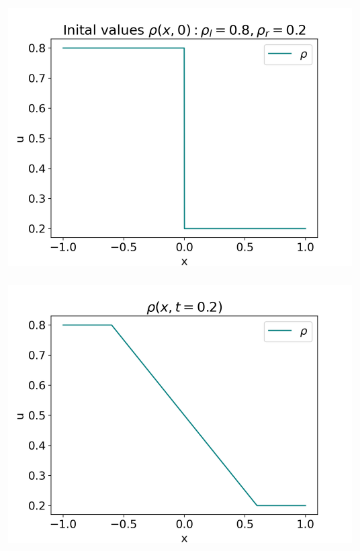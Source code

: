 \documentclass[10pt]{article}
\numberwithin{equation}{section}
\begin{document}
\begin{figure}
     \centering
     \begin{subfigure}[b]{0.3\textwidth}
         \centering
         \includegraphics[width=\textwidth]{Figures/Model/RarefacIV.png}
     \end{subfigure}
     \hfill
     \begin{subfigure}[b]{0.3\textwidth}
         \centering
         \includegraphics[width=\textwidth]{Figures/Model/RarefacAtTime.png}
     \end{subfigure}
     \hfill

\end{figure}
\end{document}
